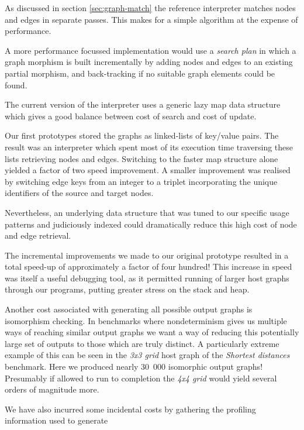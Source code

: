 As discussed in section \ref{sec:graph-match} the reference interpreter matches nodes and edges in separate passes. This makes for a simple algorithm at the expense of performance.

A more performance focussed implementation would use a \textit{search plan}\cite{Horvath-Varro07} in which a graph morphism is built incrementally by adding nodes and edges to an existing partial morphism, and back-tracking if no suitable graph elements could be found.



The current version of the interpreter uses a generic lazy map data structure which gives a good balance between cost of search and cost of update. 

Our first prototypes stored the graphs as linked-lists of key/value pairs. The result was an interpreter which spent most of its execution time traversing these lists retrieving nodes and edges. Switching to the faster map structure alone yielded a factor of two speed improvement. A smaller improvement was realised by switching edge keys from an integer to a triplet incorporating the unique identifiers of the source and target nodes.

Nevertheless, an underlying data structure that was tuned to our specific usage patterns and judiciously indexed could dramatically reduce this high cost of node and edge retrieval.

The incremental improvements we made to our original prototype resulted in a total speed-up of approximately a factor of four hundred! This increase in speed was itself a useful debugging tool, as it permitted running of larger host graphs through our programs, putting greater stress on the stack and heap.


Another cost associated with generating all possible output graphs is isomorphism checking. In benchmarks where nondeterminism gives us multiple ways of reaching similar output graphs we want a way of reducing this potentially large set of outputs to those which are truly distinct. A particularly extreme example of this can be seen in the \textit{3x3 grid} host graph of the \textit{Shortest distances} benchmark. Here we produced nearly 30~000 isomorphic output graphs! Presumably if allowed to run to completion the \textit{4x4 grid} would yield several orders of magnitude more.



We have also incurred some incidental costs by gathering the profiling information used to generate 



